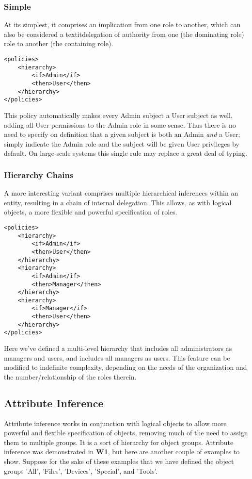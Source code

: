 \documentclass{article}
\begin{document}
\subsubsection{Simple}
At its simplest, it comprises an implication from one role to another, which can also be considered a textit{delegation} of authority from one (the dominating role) role to another (the containing role).
\begin{lstlisting}
<policies>
    <hierarchy>
        <if>Admin</if>
        <then>User</then>
    </hierarchy>
</policies>
\end{lstlisting}
This policy automatically makes every Admin subject a User subject as well, adding all User permissions to the Admin role in some sense. Thus there is no need to specify on definition that a given subject is both an Admin \textit{and} a User; simply indicate the Admin role and the subject will be given User privileges by default. On large-scale systems this single rule may replace a great deal of typing.

\subsubsection{Hierarchy Chains}
A more interesting variant comprises multiple hierarchical inferences within an entity, resulting in a chain of internal delegation. This allows, as with logical objects, a more flexible and powerful specification of roles.
\begin{lstlisting}
<policies>
    <hierarchy>
        <if>Admin</if>
        <then>User</then>
    </hierarchy>
    <hierarchy>
        <if>Admin</if>
        <then>Manager</then>
    </hierarchy>
    <hierarchy>
        <if>Manager</if>
        <then>User</then>
    </hierarchy>
</policies>
\end{lstlisting}
Here we've defined a multi-level hierarchy that includes all administrators as managers and users, and includes all managers as users.
This feature can be modified to indefinite complexity, depending on the needs of the organization and the number/relationship of the roles therein. \\

\subsection{Attribute Inference}
Attribute inference works in conjunction with logical objects to allow more powerful and flexible specification of objects, removing much of the need to assign them to multiple groups. It is a sort of hierarchy for object groups.
Attribute inference was demonstrated in \textbf{W1}, but here are another couple of examples to show. Suppose for the sake of these examples that we have defined the object groups 'All', 'Files', 'Devices', 'Special', and 'Tools'.
\end{document}
